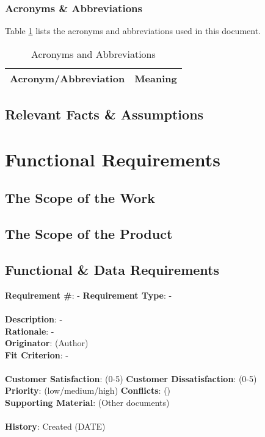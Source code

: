 \documentclass[titlepage]{article}
\begin{document}
\subsubsection{Acronyms \& Abbreviations}
Table \ref{tab:Acronyms} lists the acronyms and abbreviations used in this document.
\begin{table}[h!]
\centering
\caption{Acronyms and Abbreviations}
    \begin{tabular}{| p{6cm} | p{6cm} |}    \hline
    \textbf{Acronym/Abbreviation} &\textbf{Meaning}\\ \hline
    \end{tabular}
\label{tab:Acronyms}
\end{table}

\subsection{Relevant Facts \& Assumptions}


\section{Functional Requirements}
\subsection{The Scope of the Work}

\subsection{The Scope of the Product}

\subsection{Functional \& Data Requirements}
\begin{framed}
\noindent\textbf{Requirement \#}: - \hfill \textbf{Requirement Type}: - \hfill\\\\
\noindent\textbf{Description}: -\\
\textbf{Rationale}: -\\
\textbf{Originator}: (Author)\\
\textbf{Fit Criterion}: -\\\\
\noindent\textbf{Customer Satisfaction}: (0-5) \hfill 	\textbf{Customer Dissatisfaction}: (0-5) \hfill\\
\textbf{Priority}: (low/medium/high) \hfill \textbf{Conflicts}: () \hfill 		\\
\textbf{Supporting Material}: (Other documents)\\\\
\noindent\textbf{History}: Created (DATE)
\end{framed}
\end{document}

